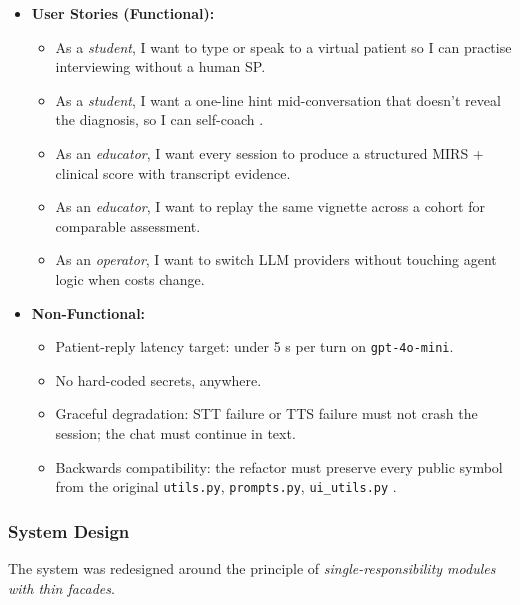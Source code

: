 \documentclass{article}
\begin{document}
\begin{itemize}
    \item \textbf{User Stories (Functional):}
    \begin{itemize}
        \item As a \emph{student}, I want to type or speak to a virtual patient so I can practise interviewing without a human SP.
        \item As a \emph{student}, I want a one-line hint mid-conversation that doesn't reveal the diagnosis, so I can self-coach \cite{Krugmann2024SentimentAI}.
        \item As an \emph{educator}, I want every session to produce a structured MIRS + clinical score with transcript evidence.
        \item As an \emph{educator}, I want to replay the same vignette across a cohort for comparable assessment.
        \item As an \emph{operator}, I want to switch LLM providers without touching agent logic when costs change.
    \end{itemize}

    \item \textbf{Non-Functional:}
    \begin{itemize}
        \item Patient-reply latency target: under 5 s per turn on \texttt{gpt-4o-mini}.
        \item No hard-coded secrets, anywhere.
        \item Graceful degradation: STT failure or TTS failure must not crash the session; the chat must continue in text.
        \item Backwards compatibility: the refactor must preserve every public symbol from the original \texttt{utils.py}, \texttt{prompts.py}, \texttt{ui\_utils.py} \cite{Rygl2017SemanticVE}.
    \end{itemize}
\end{itemize}

\subsubsection{System Design}
The system was redesigned around the principle of \emph{single-responsibility modules with thin facades}.
\end{document}
